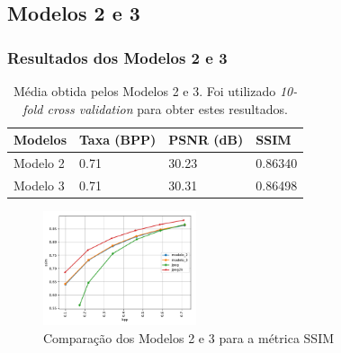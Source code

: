\documentclass{beamer}
\begin{document}
\subsection{Modelos 2 e 3}
\begin{frame}
\frametitle{Resultados dos Modelos 2 e 3}
\begin{table}
\caption{Média obtida pelos Modelos 2 e 3. Foi utilizado \textit{10-fold cross validation} para obter estes resultados.}
\begin{tabular}{|l|l|l|l|}
\hline
Modelos  & Taxa (BPP) & PSNR (dB) & SSIM    \\ \hline
Modelo 2 & 0.71       & 30.23     & 0.86340 \\ \hline
Modelo 3 & 0.71       & 30.31     & 0.86498 \\ \hline
\end{tabular}
\end{table}

\begin{figure}
\includegraphics[width=0.4\textwidth]{figs/_mean_plot_loss_ssim.pdf}
\caption{Comparação dos Modelos 2 e 3 para a métrica SSIM}
\end{figure}
\end{frame}
\end{document}

